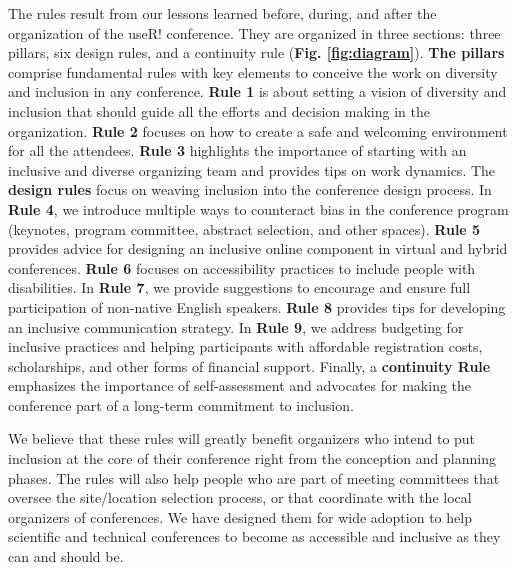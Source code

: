 \documentclass[10pt,letterpaper]{article}
\begin{document}
The rules result from our lessons learned before, during, and after the organization of the useR! conference. 
They are organized in three sections: three pillars, six design rules, and a continuity rule (\textbf{Fig. \ref{fig:diagram}}).
\textbf{The pillars} comprise fundamental rules with key elements to conceive the work on diversity and inclusion in any conference. 
\textbf{Rule 1} is about setting a vision of diversity and inclusion that should guide all the efforts and decision making in the organization.
\textbf{Rule 2} focuses on how to create a safe and welcoming environment for all the attendees. 
\textbf{Rule 3} highlights the importance of starting with an inclusive and diverse organizing team and provides tips on work dynamics.
The \textbf{design rules} focus on weaving inclusion into the conference design process.
In \textbf{Rule 4}, we introduce multiple ways to counteract bias in the conference program (keynotes, program committee, abstract selection, and other spaces). 
\textbf{Rule 5} provides advice for designing an inclusive online component in virtual and hybrid conferences.
\textbf{Rule 6} focuses on accessibility practices to include people with disabilities.
In \textbf{Rule 7}, we provide suggestions to encourage and ensure full participation of non-native English speakers. 
\textbf{Rule 8} provides tips for developing an inclusive communication strategy. 
In \textbf{Rule 9}, we address budgeting for inclusive practices and helping participants with affordable registration costs, scholarships, and other forms of financial support.
Finally, 
a \textbf{continuity Rule} emphasizes the importance of self-assessment and advocates for making the conference part of a long-term commitment to inclusion. 

We believe that these rules will greatly benefit organizers who intend to put inclusion at the core of their conference right from the conception and planning phases.
The rules will also help people who are part of meeting committees that oversee the site/location selection process, or that coordinate with the local organizers of conferences. 
We have designed them for wide adoption to help scientific and technical conferences to become as accessible and inclusive as they can and should be.


\end{document}
